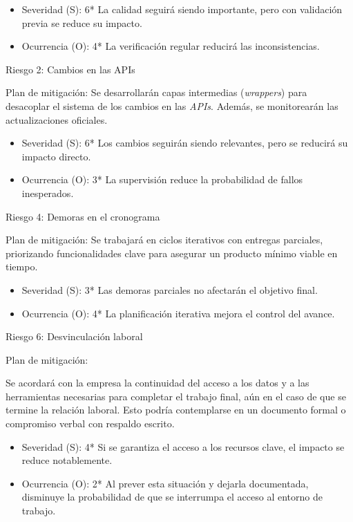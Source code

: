 \documentclass[
11pt, %
]{charter}
\begin{document}
\begin{itemize}
\item Severidad (S): 6*
La calidad seguirá siendo importante, pero con validación previa se reduce su impacto.

\item Ocurrencia (O): 4*
La verificación regular reducirá las inconsistencias.
\end{itemize}


Riesgo 2: Cambios en las APIs

Plan de mitigación:
Se desarrollarán capas intermedias (\textit{wrappers}) para desacoplar el sistema de los cambios en las \textit{APIs}. Además, se monitorearán las actualizaciones oficiales.

\begin{itemize}
\item Severidad (S): 6*
Los cambios seguirán siendo relevantes, pero se reducirá su impacto directo.

\item Ocurrencia (O): 3*
La supervisión reduce la probabilidad de fallos inesperados.
\end{itemize}

Riesgo 4: Demoras en el cronograma

Plan de mitigación:
Se trabajará en ciclos iterativos con entregas parciales, priorizando funcionalidades clave para asegurar un producto mínimo viable en tiempo.

\begin{itemize}
\item Severidad (S): 3*
Las demoras parciales no afectarán el objetivo final.

\item Ocurrencia (O): 4*
La planificación iterativa mejora el control del avance.
\end{itemize}

Riesgo 6: Desvinculación laboral

Plan de mitigación:

Se acordará con la empresa la continuidad del acceso a los datos y a las herramientas necesarias para completar el trabajo final, aún en el caso de que se termine la relación laboral. Esto podría contemplarse en un documento formal o compromiso verbal con respaldo escrito.

\begin{itemize}
	\item Severidad (S): 4*
Si se garantiza el acceso a los recursos clave, el impacto se reduce notablemente.

	\item Ocurrencia (O): 2*
Al prever esta situación y dejarla documentada, disminuye la probabilidad de que se interrumpa el acceso al entorno de trabajo.
\end{itemize}
\end{document}
